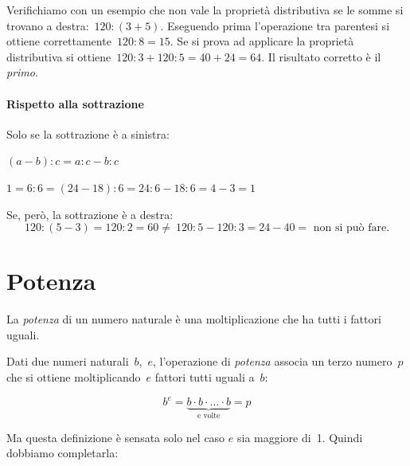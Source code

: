 Verifichiamo con un esempio che non vale la proprietà distributiva se le 
somme 
si trovano a destra:~\(120:(3+5)\).
Eseguendo prima l'operazione tra parentesi si ottiene 
correttamente~\(120:8=15\). Se si prova ad applicare
la proprietà distributiva si ottiene~\(120:3+120:5=40+24=64\). 
Il risultato corretto è il \emph{primo}.

\paragraph{Rispetto alla sottrazione}
Solo se la sottrazione è a sinistra:

\vspace{.5em}
\begin{minipage}{.38\textwidth}
 \((a-b):c=a:c-b:c\)
\end{minipage}
\hfill
\begin{minipage}{.58\textwidth}
 \(1 = 6 : 6 = (24-18) : 6 = 24 : 6 - 18 : 6 = 4 - 3 = 1\)
\end{minipage}

Se, però, la sottrazione è a destra:
\[120:(5-3)=120:2=60\neq~120:5-120:3=24-40=\text{ non si può fare.}\]


\section{Potenza}
\label{sec:nat_potenza}

La \emph{potenza} di un numero naturale è una moltiplicazione che ha tutti 
i fattori uguali.

\begin{definizione}{}{}
Dati due numeri naturali~\(b\),~\(e\), l'operazione di \emph{potenza} 
associa un terzo numero~\(p\) che si ottiene moltiplicando~\(e\) fattori 
tutti 
uguali a~\(b\):
\begin{inaccessibleblock}[
  \[b^e = \mbox{e volte}{b \cdot b \cdot  \dots  \cdot b} = p\]
  ]
\[b^e = \underbrace{b \cdot b \cdot \dots \cdot b}_{\text{e volte}} = p\]
\end{inaccessibleblock}

\end{definizione}

Ma questa definizione è sensata solo nel caso \(e\) sia maggiore di~1.
Quindi dobbiamo completarla:

